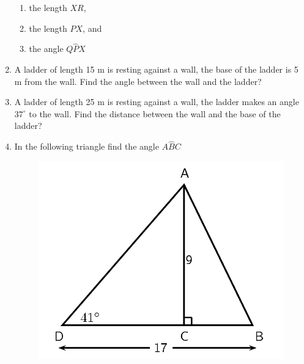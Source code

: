 \begin{enumerate}[noitemsep, label=\textbf{\arabic*}. ]
\label{m39414*id92364}\begin{enumerate}[noitemsep, label=\textbf{\alph*}. ] 
            \label{m39414*uid100}\item the length \begin{math}XR\end{math},
\label{m39414*uid101}\item the length \begin{math}PX\end{math}, and
\label{m39414*uid102}\item the angle \begin{math}Q\hat{P}X\end{math}\end{enumerate}
                \label{m39414*uid103}\item A ladder of length 15 m is resting against a wall, the base of the ladder is 5 m from the wall. Find the angle between the wall and the ladder?\newline
\label{m39414*uid104}\item A ladder of length 25 m is resting against a wall, the ladder makes an angle \begin{math}{37}^{\circ }\end{math} to the wall. Find the distance between the wall and the base of the ladder?\newline
\label{m39414*uid105}\item In the following triangle find the angle \begin{math}A\hat{B}C\end{math}
    \setcounter{subfigure}{0}
	\begin{figure}[H] %
    \begin{center}
    \label{m39414*id92525!!!underscore!!!media}\label{m39414*id92525!!!underscore!!!printimage}\includegraphics{col11306.imgs/m39414_MG10C15_042.png} %

\end{center}
\end{figure}
\end{enumerate}
